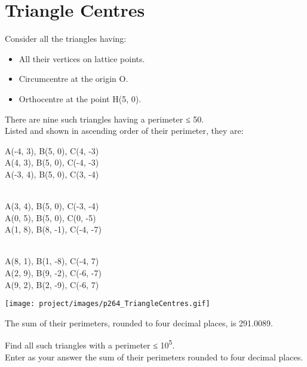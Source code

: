 \section[Problem \#264: Triangle Centres]{Triangle Centres}
\label{sec:problem_264}

Consider all the triangles having:

\begin{itemize}
\tightlist
\item
  All their vertices on {lattice points}.
\item Circumcentre at the origin O.
\item Orthocentre at the point H(5, 0).
\end{itemize}

There are nine such triangles having a perimeter ≤ 50.\\
Listed and shown in ascending order of their perimeter, they are:

\begin{center}
\begin{minipage}[m]{0.35\linewidth}
A(-4, 3), B(5, 0), C(4, -3)\\
A(4, 3), B(5, 0), C(-4, -3)\\
A(-3, 4), B(5, 0), C(3, -4)\\
\strut \\
A(3, 4), B(5, 0), C(-3, -4)\\
A(0, 5), B(5, 0), C(0, -5)\\
A(1, 8), B(8, -1), C(-4, -7)\\
\strut \\
A(8, 1), B(1, -8), C(-4, 7)\\
A(2, 9), B(9, -2), C(-6, -7)\\
A(9, 2), B(2, -9), C(-6, 7)\\
\end{minipage}
\begin{minipage}[m]{0.35\linewidth}
\texttt{[image: project/images/p264\_TriangleCentres.gif]}
\end{minipage}
\end{center}

The sum of their perimeters, rounded to four decimal places, is
291.0089.

Find all such triangles with a perimeter ≤ 10\textsuperscript{5}.\\
Enter as your answer the sum of their perimeters rounded to four decimal
places.